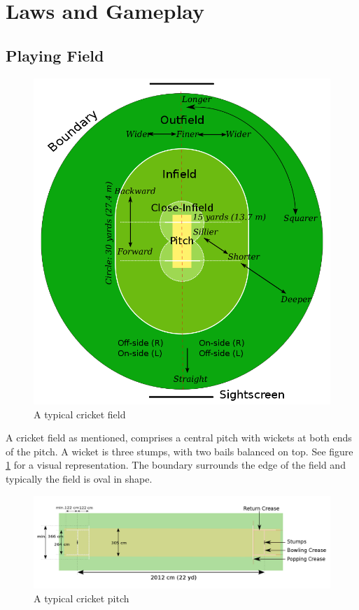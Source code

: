\documentclass[12pt,a4paper]{report}
\theoremstyle{definition}
\begin{document}
\section{Laws and Gameplay}

\subsection{Playing Field}

\begin{figure}[H]
    \centering
    \includegraphics[width=0.8\linewidth]{Cricket_Field.png}
    \caption{A typical cricket field \citep{cricketWiki}}
    \label{fig:CricketField}
\end{figure}

A cricket field as mentioned, comprises a central pitch with wickets at both ends of the pitch. 
A wicket is three stumps, with two bails balanced on top. 
See figure \ref{fig:CricketField} for a visual representation.
The boundary surrounds the edge of the field and typically the field is oval in shape.

\begin{figure}[H]
    \centering
    \includegraphics[width=0.8\linewidth]{Cricket_Pitch.png}
    \caption{A typical cricket pitch \citep{cricketWiki}}
    \label{fig:CricketPitch}
\end{figure}
\end{document}
